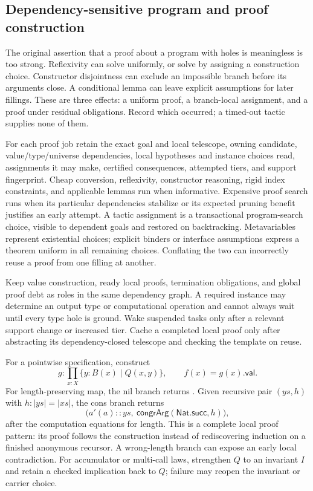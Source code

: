 \subsection{Dependency-sensitive program and proof construction}\label{sec:contract-readiness}

The original assertion that a proof about a program with holes is meaningless is too strong. Reflexivity can solve  uniformly, or solve  by assigning a construction choice. Constructor disjointness can exclude an impossible branch before its arguments close. A conditional lemma can leave explicit assumptions for later fillings. These are three effects: a uniform proof, a branch-local assignment, and a proof under residual obligations. Record which occurred; a timed-out tactic supplies none of them.

For each proof job retain the exact goal and local telescope, owning candidate, value/type/universe dependencies, local hypotheses and instance choices read, assignments it may make, certified consequences, attempted tiers, and support fingerprint. Cheap conversion, reflexivity, constructor reasoning, rigid index constraints, and applicable lemmas run when informative. Expensive proof search runs when its particular dependencies stabilize or its expected pruning benefit justifies an early attempt. A tactic assignment is a transactional program-search choice, visible to dependent goals and restored on backtracking. Metavariables represent existential choices; explicit binders or interface assumptions express a theorem uniform in all remaining choices. Conflating the two can incorrectly reuse a proof from one filling at another.

Keep value construction, ready local proofs, termination obligations, and global proof debt as roles in the same dependency graph. A required instance may determine an output type or computational operation and cannot always wait until every type hole is ground. Wake suspended tasks only after a relevant support change or increased tier. Cache a completed local proof only after abstracting its dependency-closed telescope and checking the template on reuse.

For a pointwise specification, construct
\[
 g : \prod_{x:X}\{y:B(x)\mid Q(x,y)\},\qquad f(x)=g(x).\mathsf{val}.
\]
For length-preserving map, the nil branch returns . Given recursive pair $(ys,h)$ with $h:|ys|=|xs|$, the cons branch returns
\[
 \bigl(a'(a)::ys,\ \mathsf{congrArg}(\mathsf{Nat.succ},h)\bigr),
\]
after the computation equations for length. This is a complete local proof pattern: its proof follows the construction instead of rediscovering induction on a finished anonymous recursor. A wrong-length branch can expose an early local contradiction. For accumulator or multi-call laws, strengthen $Q$ to an invariant $I$ and retain a checked implication back to $Q$; failure may reopen the invariant or carrier choice.

